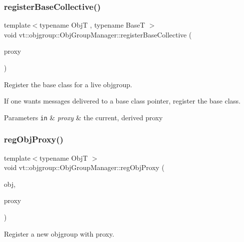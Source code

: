 \subsubsection{\texorpdfstring{register\+Base\+Collective()}{registerBaseCollective()}}
{\footnotesize\ttfamily template$<$typename ObjT , typename BaseT $>$ \\
void vt\+::objgroup\+::\+Obj\+Group\+Manager\+::register\+Base\+Collective (\begin{DoxyParamCaption}\item[{\hyperlink{structvt_1_1objgroup_1_1_obj_group_manager_aea65eef52f240a52210132eef5ce591f}{Proxy\+Type}$<$ ObjT $>$}]{proxy }\end{DoxyParamCaption})}



Register the base class for a live objgroup. 

If one wants messages delivered to a base class pointer, register the base class.


\begin{DoxyParams}[1]{Parameters}
\mbox{\tt in}  & {\em proxy} & the current, derived proxy \\
\hline
\end{DoxyParams}
\mbox{\label{structvt_1_1objgroup_1_1_obj_group_manager_a73d5d6f3f63c1243d7f0ea11f33a4661}} 
\subsubsection{\texorpdfstring{reg\+Obj\+Proxy()}{regObjProxy()}}
{\footnotesize\ttfamily template$<$typename ObjT $>$ \\
void vt\+::objgroup\+::\+Obj\+Group\+Manager\+::reg\+Obj\+Proxy (\begin{DoxyParamCaption}\item[{ObjT $\ast$}]{obj,  }\item[{\hyperlink{namespacevt_ad7cae989df485fccca57f0792a880a8e}{Obj\+Group\+Proxy\+Type}}]{proxy }\end{DoxyParamCaption})\hspace{0.3cm}{\ttfamily [private]}}



Register a new objgroup with proxy. 


